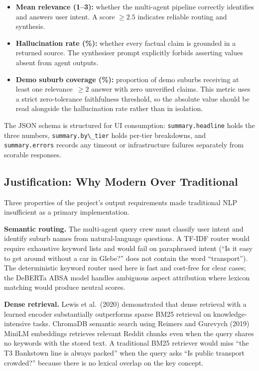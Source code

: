 \documentclass[11pt,a4paper]{article}
\newcommand{\passthrough}[1]{#1}
\providecommand{\tightlist}{%
  \setlength{\itemsep}{0pt}\setlength{\parskip}{0pt}}
\begin{document}
\begin{itemize}
\tightlist
\item
  \textbf{Mean relevance (1--3):} whether the multi-agent pipeline correctly identifies and answers user intent. A score $\ge 2.5$ indicates reliable routing and synthesis.
\item
  \textbf{Hallucination rate (\%):} whether every factual claim is grounded in a returned source. The synthesiser prompt explicitly forbids asserting values absent from agent outputs.
\item
  \textbf{Demo suburb coverage (\%):} proportion of demo suburbs receiving at least one relevance~$\ge 2$ answer with zero unverified claims. This metric uses a strict zero-tolerance faithfulness threshold, so the absolute value should be read alongside the hallucination rate rather than in isolation.
\end{itemize}

The JSON schema is structured for UI consumption: \passthrough{\lstinline!summary.headline!} holds the three numbers, \passthrough{\lstinline!summary.by\_tier!} holds per-tier breakdowns, and \passthrough{\lstinline!summary.errors!} records any timeout or infrastructure failures separately from scorable responses.

\subsection{Justification: Why Modern Over Traditional}\label{54-justification-why-modern-over-traditional}

Three properties of the project's output requirements made traditional NLP insufficient as a primary implementation.

\textbf{Semantic routing.} The multi-agent query crew must classify user intent and identify suburb names from natural-language questions. A TF-IDF router would require exhaustive keyword lists and would fail on paraphrased intent (``Is it easy to get around without a car in Glebe?'' does not contain the word ``transport''). The deterministic keyword router used here is fast and cost-free for clear cases; the DeBERTa ABSA model handles ambiguous aspect attribution where lexicon matching would produce neutral scores.

\textbf{Dense retrieval.} Lewis et al.\ (2020) demonstrated that dense retrieval with a learned encoder substantially outperforms sparse BM25 retrieval on knowledge-intensive tasks. ChromaDB semantic search using Reimers and Gurevych (2019) MiniLM embeddings retrieves relevant Reddit chunks even when the query shares no keywords with the stored text. A traditional BM25 retriever would miss ``the T3 Bankstown line is always packed'' when the query asks ``Is public transport crowded?'' because there is no lexical overlap on the key concept.
\end{document}
